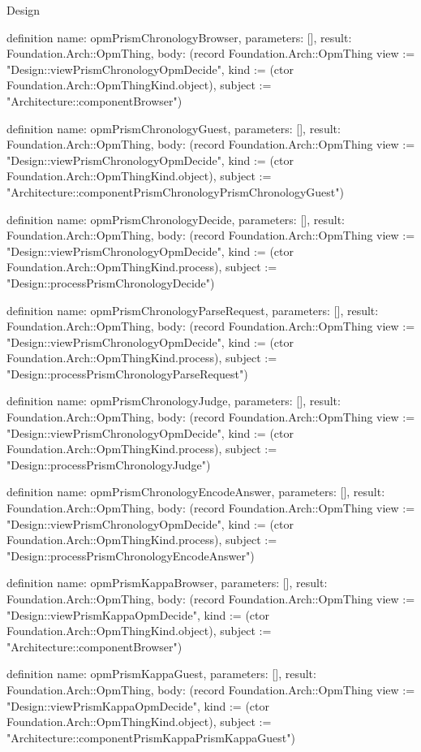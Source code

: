 \begin{lexlean}{Design}
\begin{semanticmodule}
definition{
  name: opmPrismChronologyBrowser,
  parameters: [],
  result: Foundation.Arch::OpmThing,
  body: (record Foundation.Arch::OpmThing {view := "Design::viewPrismChronologyOpmDecide", kind := (ctor Foundation.Arch::OpmThingKind.object), subject := "Architecture::componentBrowser"})
}

definition{
  name: opmPrismChronologyGuest,
  parameters: [],
  result: Foundation.Arch::OpmThing,
  body: (record Foundation.Arch::OpmThing {view := "Design::viewPrismChronologyOpmDecide", kind := (ctor Foundation.Arch::OpmThingKind.object), subject := "Architecture::componentPrismChronologyPrismChronologyGuest"})
}

definition{
  name: opmPrismChronologyDecide,
  parameters: [],
  result: Foundation.Arch::OpmThing,
  body: (record Foundation.Arch::OpmThing {view := "Design::viewPrismChronologyOpmDecide", kind := (ctor Foundation.Arch::OpmThingKind.process), subject := "Design::processPrismChronologyDecide"})
}

definition{
  name: opmPrismChronologyParseRequest,
  parameters: [],
  result: Foundation.Arch::OpmThing,
  body: (record Foundation.Arch::OpmThing {view := "Design::viewPrismChronologyOpmDecide", kind := (ctor Foundation.Arch::OpmThingKind.process), subject := "Design::processPrismChronologyParseRequest"})
}

definition{
  name: opmPrismChronologyJudge,
  parameters: [],
  result: Foundation.Arch::OpmThing,
  body: (record Foundation.Arch::OpmThing {view := "Design::viewPrismChronologyOpmDecide", kind := (ctor Foundation.Arch::OpmThingKind.process), subject := "Design::processPrismChronologyJudge"})
}

definition{
  name: opmPrismChronologyEncodeAnswer,
  parameters: [],
  result: Foundation.Arch::OpmThing,
  body: (record Foundation.Arch::OpmThing {view := "Design::viewPrismChronologyOpmDecide", kind := (ctor Foundation.Arch::OpmThingKind.process), subject := "Design::processPrismChronologyEncodeAnswer"})
}

definition{
  name: opmPrismKappaBrowser,
  parameters: [],
  result: Foundation.Arch::OpmThing,
  body: (record Foundation.Arch::OpmThing {view := "Design::viewPrismKappaOpmDecide", kind := (ctor Foundation.Arch::OpmThingKind.object), subject := "Architecture::componentBrowser"})
}

definition{
  name: opmPrismKappaGuest,
  parameters: [],
  result: Foundation.Arch::OpmThing,
  body: (record Foundation.Arch::OpmThing {view := "Design::viewPrismKappaOpmDecide", kind := (ctor Foundation.Arch::OpmThingKind.object), subject := "Architecture::componentPrismKappaPrismKappaGuest"})
}


\end{semanticmodule}
\end{lexlean}
